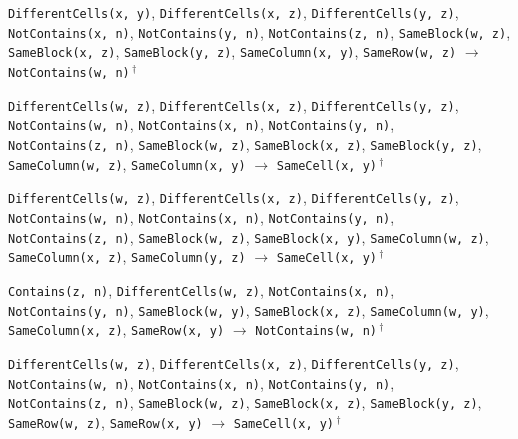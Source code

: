 \documentclass[11pt,a4paper]{article}
\theoremstyle{definition}
\theoremstyle{remark}
\begin{document}
{\begin{enumerate}[label={[\arabic*]},leftmargin=2.6em,itemsep=1pt]
  \item \texttt{DifferentCells(x,~y)}, \allowbreak \texttt{DifferentCells(x,~z)}, \allowbreak \texttt{DifferentCells(y,~z)}, \allowbreak \texttt{NotContains(x,~n)}, \allowbreak \texttt{NotContains(y,~n)}, \allowbreak \texttt{NotContains(z,~n)}, \allowbreak \texttt{SameBlock(w,~z)}, \allowbreak \texttt{SameBlock(x,~z)}, \allowbreak \texttt{SameBlock(y,~z)}, \allowbreak \texttt{SameColumn(x,~y)}, \allowbreak \texttt{SameRow(w,~z)} \;$\to$\; \texttt{NotContains(w,~n)}\,$^{\dagger}$
  \item \texttt{DifferentCells(w,~z)}, \allowbreak \texttt{DifferentCells(x,~z)}, \allowbreak \texttt{DifferentCells(y,~z)}, \allowbreak \texttt{NotContains(w,~n)}, \allowbreak \texttt{NotContains(x,~n)}, \allowbreak \texttt{NotContains(y,~n)}, \allowbreak \texttt{NotContains(z,~n)}, \allowbreak \texttt{SameBlock(w,~z)}, \allowbreak \texttt{SameBlock(x,~z)}, \allowbreak \texttt{SameBlock(y,~z)}, \allowbreak \texttt{SameColumn(w,~z)}, \allowbreak \texttt{SameColumn(x,~y)} \;$\to$\; \texttt{SameCell(x,~y)}\,$^{\dagger}$
  \item \texttt{DifferentCells(w,~z)}, \allowbreak \texttt{DifferentCells(x,~z)}, \allowbreak \texttt{DifferentCells(y,~z)}, \allowbreak \texttt{NotContains(w,~n)}, \allowbreak \texttt{NotContains(x,~n)}, \allowbreak \texttt{NotContains(y,~n)}, \allowbreak \texttt{NotContains(z,~n)}, \allowbreak \texttt{SameBlock(w,~z)}, \allowbreak \texttt{SameBlock(x,~y)}, \allowbreak \texttt{SameColumn(w,~z)}, \allowbreak \texttt{SameColumn(x,~z)}, \allowbreak \texttt{SameColumn(y,~z)} \;$\to$\; \texttt{SameCell(x,~y)}\,$^{\dagger}$
  \item \texttt{Contains(z,~n)}, \allowbreak \texttt{DifferentCells(w,~z)}, \allowbreak \texttt{NotContains(x,~n)}, \allowbreak \texttt{NotContains(y,~n)}, \allowbreak \texttt{SameBlock(w,~y)}, \allowbreak \texttt{SameBlock(x,~z)}, \allowbreak \texttt{SameColumn(w,~y)}, \allowbreak \texttt{SameColumn(x,~z)}, \allowbreak \texttt{SameRow(x,~y)} \;$\to$\; \texttt{NotContains(w,~n)}\,$^{\dagger}$
  \item \texttt{DifferentCells(w,~z)}, \allowbreak \texttt{DifferentCells(x,~z)}, \allowbreak \texttt{DifferentCells(y,~z)}, \allowbreak \texttt{NotContains(w,~n)}, \allowbreak \texttt{NotContains(x,~n)}, \allowbreak \texttt{NotContains(y,~n)}, \allowbreak \texttt{NotContains(z,~n)}, \allowbreak \texttt{SameBlock(w,~z)}, \allowbreak \texttt{SameBlock(x,~z)}, \allowbreak \texttt{SameBlock(y,~z)}, \allowbreak \texttt{SameRow(w,~z)}, \allowbreak \texttt{SameRow(x,~y)} \;$\to$\; \texttt{SameCell(x,~y)}\,$^{\dagger}$

\end{enumerate}}
\end{document}
